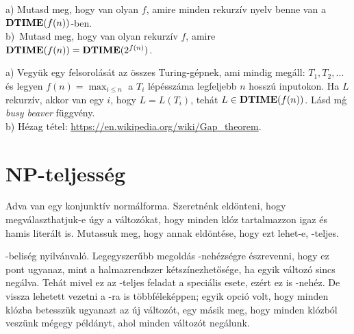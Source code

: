 \begin{Exercise}[counter={sorszam}, difficulty=0]
	a) Mutasd meg, hogy van olyan $f$, amire minden rekurzív nyelv benne van a $\mbox{\ensuremath{\mathbf{DTIME}}}(f(n))$-ben.\\
	b)~\hard Mutasd meg, hogy van olyan rekurz\'iv $f$, amire $\mbox{\ensuremath{\mathbf{DTIME}}}(f(n))=\mbox{\ensuremath{\mathbf{DTIME}}}(2^{f(n)})$.
\end{Exercise}	
\begin{Answer}
	a) Vegy\"uk egy felsorol\'as\'at az \"osszes Turing-g\'epnek, ami mindig meg\'all: $T_1, T_2, \ldots$ \'es legyen $f(n)=\max_{i\le n}$ a $T_i$ l\'ep\'essz\'ama legfeljebb $n$ hossz\'u inputokon. Ha $L$ rekurz\'iv, akkor van egy $i$, hogy $L=L(T_i)$, teh\'at $L\in \mbox{\ensuremath{\mathbf{DTIME}}}(f(n))$.
	L\'asd m\'g \emph{busy beaver} f\"uggv\'eny.\\
	b) H\'ezag t\'etel: \url{https://en.wikipedia.org/wiki/Gap_theorem}.
\end{Answer}


\section{NP-teljess\'eg}


\begin{Exercise}[counter={sorszam}, difficulty=0]
	Adva van egy konjunktív normálforma. Szeretnénk eldönteni, hogy megválaszthatjuk-e úgy a változókat, hogy minden klóz tartalmazzon igaz és hamis literált is. Mutassuk meg, hogy annak eldöntése, hogy ezt lehet-e, \NP-teljes.
\end{Exercise}	
\begin{Answer}
	\NP-belis\'eg nyilv\'anval\'o.
	Legegyszer\H ubb megold\'as \NP-neh\'ezs\'egre \'eszrevenni, hogy ez pont ugyanaz, mint a halmazrendszer k\'etsz\'inezhet\H os\'ege, ha egyik v\'altoz\'o sincs neg\'alva. Teh\'at mivel ez az \NP-teljes feladat a speci\'alis esete, ez\'ert ez is \NP-neh\'ez.
	De vissza lehetett vezetni a \SAT-ra is t\"obbf\'elek\'eppen; egyik opci\'o volt, hogy minden kl\'ozba betessz\"uk ugyanazt az \'uj v\'altoz\'ot, egy m\'asik meg, hogy minden kl\'ozb\'ol vesz\"unk m\'egegy p\'eld\'anyt, ahol minden v\'altoz\'ot neg\'alunk.
\end{Answer}




